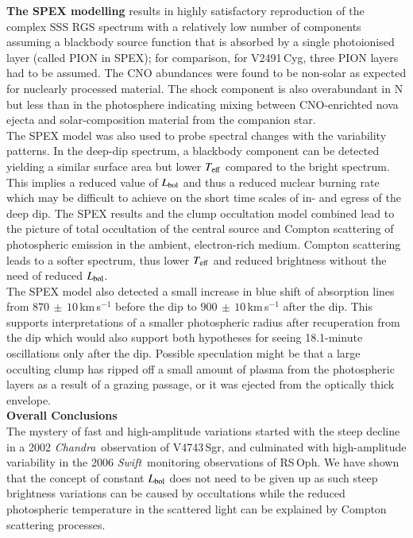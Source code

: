\documentclass{aa}
\newcommand{\chandra}{{\it Chandra}}
\newcommand{\swift}{{\it Swift}}
\begin{document}
{\bf The SPEX modelling} results in highly satisfactory reproduction
of the complex SSS RGS spectrum with a relatively low number of components
assuming a blackbody source function that is absorbed by a single
photoionised layer (called {\scriptsize{PION}}
in SPEX); for comparison, for V2491\,Cyg,
three {\scriptsize{PION}} layers had to be assumed. The CNO abundances were found to be
non-solar as expected for nuclearly processed material.
The shock component is also overabundant in N but less than in the
photosphere indicating mixing between CNO-enrichted nova ejecta and
solar-composition material from the companion star.\\

The SPEX model was also used to probe spectral changes with the
variability patterns. In the deep-dip spectrum, a blackbody component
can be detected yielding a similar surface area but lower $T_{\rm eff}$
compared to the bright spectrum. This implies a reduced value of $L_{\rm bol}$
and thus a reduced nuclear burning rate which may be difficult to
achieve on the short time scales of in- and egress of the deep dip.
The SPEX results and the clump occultation model combined lead to the
picture of total occultation of the central source and Compton scattering
of photospheric emission in the ambient, electron-rich medium. 
Compton scattering leads to a softer spectrum, thus lower $T_{\rm eff}$
and reduced brightness without the need of reduced $L_{\rm bol}$.\\
 
The SPEX model also detected a small increase in blue shift of
absorption lines from $870\,\pm\,10$\,km\,s$^{-1}$ before the dip
to $900\,\pm\,10$\,km\,s$^{-1}$ after the dip. This supports interpretations of
a smaller photospheric radius after recuperation from the dip which
would also support both hypotheses for seeing 18.1-minute oscillations
only after the dip. Possible speculation might be that a large occulting
clump has ripped off a small amount of plasma from the
photospheric layers as a result of a grazing passage, or it was ejected
from the optically thick envelope.\\

{\bf Overall Conclusions}\\
The mystery of fast and high-amplitude variations started with
the steep decline in a 2002 \chandra\ observation of V4743\,Sgr,
and culminated with high-amplitude variability in the 2006 \swift\
monitoring observations of RS\,Oph. We have shown that the concept
of constant $L_{\rm bol}$ does not need to be given up as
such steep brightness variations can be caused by occultations while
the reduced photospheric temperature in the scattered light can be
explained by Compton scattering processes.
\end{document}
